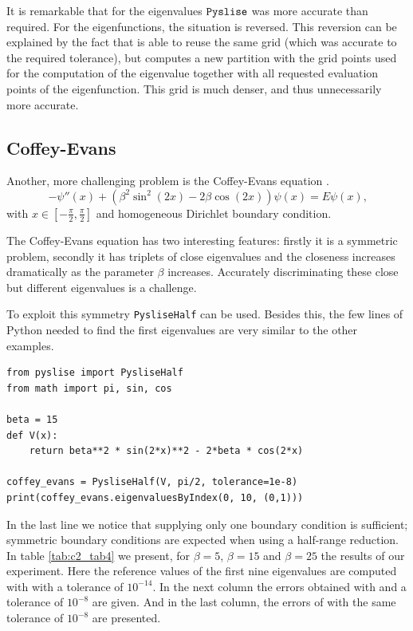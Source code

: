 It is remarkable that for the eigenvalues $\texttt{Pyslise}{}$ was more accurate than required. For the eigenfunctions, the situation is reversed. This reversion can be explained by the fact that \pyslise{} is able to reuse the same grid (which was accurate to the required tolerance), but  computes a new partition with the grid points used for the computation of the eigenvalue together with all requested evaluation points of the eigenfunction. This grid is much denser, and thus unnecessarily more accurate.

\subsection{Coffey-Evans}\label{coffey-evans}

Another, more challenging problem is the Coffey-Evans equation \cite{pryce_error_1986}.
\begin{equation}
  -\psi''(x) + (\beta^2\sin^2(2x)-2\beta\cos(2x))\psi(x) = E\psi(x)\text{,}\label{equ:c2_coffey_evans}
\end{equation}
with $x \in [-\frac{\pi}{2}, \frac{\pi}{2}]$ and homogeneous Dirichlet boundary condition.

The Coffey-Evans equation has two interesting features: firstly it is a symmetric problem, secondly it has triplets of close eigenvalues and the closeness increases dramatically as the parameter $\beta$ increases. Accurately discriminating these close but different eigenvalues is a challenge.

To exploit this symmetry \texttt{PysliseHalf} can be used. Besides this, the few lines of Python needed to find the first eigenvalues are very similar to the other examples.

\begin{verbatim}
from pyslise import PysliseHalf
from math import pi, sin, cos

beta = 15
def V(x):
    return beta**2 * sin(2*x)**2 - 2*beta * cos(2*x)

coffey_evans = PysliseHalf(V, pi/2, tolerance=1e-8)
print(coffey_evans.eigenvaluesByIndex(0, 10, (0,1)))
\end{verbatim}

In the last line we notice that supplying only one boundary condition is sufficient; symmetric boundary conditions are expected when using a half-range reduction. In table \ref{tab:c2_tab4} we present, for $\beta=5$, $\beta=15$ and $\beta=25$ the results of our experiment. Here the reference values of the first nine eigenvalues are computed with  with a tolerance of $10^{-14}$. In the next column the errors obtained with  and a tolerance of $10^{-8}$ are given. And in the last column, the errors of \pyslise{} with the same tolerance of $10^{-8}$ are presented.


